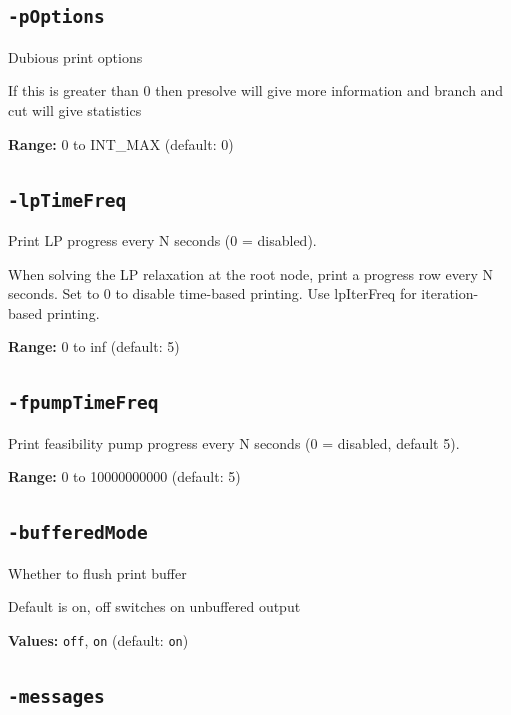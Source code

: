 \documentclass[11pt,a4paper]{article}
\begin{document}
\subsection*{\texttt{-pOptions}}

Dubious print options

If this is greater than 0 then presolve will give more information and branch and cut will give statistics

\textbf{Range:} 0 to INT\_MAX (default: 0)

\subsection*{\texttt{-lpTimeFreq}}

Print LP progress every N seconds (0 = disabled).

When solving the LP relaxation at the root node, print a progress row every N seconds. Set to 0 to disable time-based printing. Use lpIterFreq for iteration-based printing.

\textbf{Range:} 0 to inf (default: 5)

\subsection*{\texttt{-fpumpTimeFreq}}

Print feasibility pump progress every N seconds (0 = disabled, default 5).

\textbf{Range:} 0 to 10000000000 (default: 5)

\subsection*{\texttt{-bufferedMode}}

Whether to flush print buffer

Default is on, off switches on unbuffered output

\textbf{Values:} \texttt{off}, \texttt{on} (default: \texttt{on})

\subsection*{\texttt{-messages}}
\end{document}
